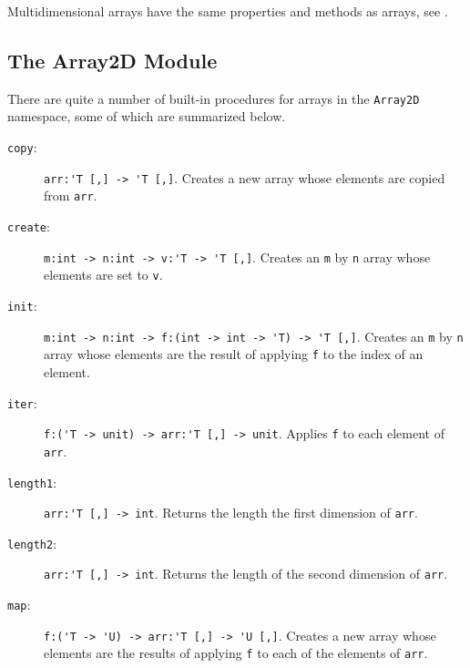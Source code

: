 \documentclass[fsharpnotes.tex]{subfiles}
\begin{document}
Multidimensional arrays have the same properties and methods as arrays, see .

\subsection{The Array2D Module}
There are quite a number of built-in procedures for arrays in the \lstinline{Array2D} namespace, some of which are summarized below.
\begin{description}
\item[\texttt{copy}:] \lstinline{arr:'T [,] -> 'T [,]}. Creates a new array whose elements are copied from \lstinline{arr}.
\item[\texttt{create}:] \lstinline{m:int -> n:int -> v:'T -> 'T [,]}. Creates an \lstinline{m} by \lstinline{n} array whose elements are set to \lstinline{v}.
\item[\texttt{init}:] \lstinline{m:int -> n:int -> f:(int -> int -> 'T) -> 'T [,]}. Creates an \lstinline{m} by \lstinline{n} array whose elements are the result of applying \lstinline{f} to the index of an element.
\item[\texttt{iter}:] \lstinline{f:('T -> unit) -> arr:'T [,] -> unit}. Applies \lstinline{f} to each element of \lstinline{arr}.
\item[\texttt{length1}:] \lstinline{arr:'T [,] -> int}. Returns the length the first dimension of \lstinline{arr}.
\item[\texttt{length2}:] \lstinline{arr:'T [,] -> int}. Returns the length of the second dimension of \lstinline{arr}.
\item[\texttt{map}:] \lstinline{f:('T -> 'U) -> arr:'T [,] -> 'U [,]}. Creates a new array whose elements are the results of applying \lstinline{f} to each of the elements of \lstinline{arr}.
\end{description}
\end{document}
